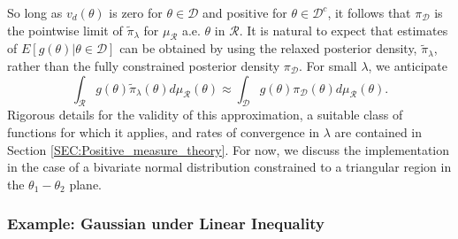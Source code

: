 \documentclass[10pt,fleqn]{article}
\DeclareMathOperator{\1}{\mathbbm{1}}
\begin{document}
So long as $v_d(\theta)$ is zero for $\theta \in \mathcal{D}$ and positive for $\theta\in\mathcal{D}^c$, it follows that $\pi_\mathcal{D}$ is the pointwise limit of $\tilde{\pi}_\lambda$ for $\mu_\mathcal{R}$ a.e. $\theta$ in $\mathcal{R}.$  It is natural to expect that estimates of $E[g(\theta)|\theta\in\mathcal{D}]$ can be obtained by using the relaxed posterior density, $\tilde{\pi}_\lambda$, rather than the fully constrained posterior density $\pi_\mathcal{D}$. For small $\lambda$, we anticipate
$$\int_\mathcal{R} g(\theta)\tilde{\pi}_\lambda(\theta) d\mu_\mathcal{R}(\theta) \approx \int_\mathcal{D} g(\theta)\pi_\mathcal{D}(\theta) d\mu_\mathcal{R}(\theta) .$$
Rigorous details for the validity of this approximation, a suitable class of functions for which it applies, and rates of convergence in $\lambda$ are contained in Section \ref{SEC:Positive_measure_theory}. For now, we discuss the implementation in the case of a bivariate normal distribution constrained to a triangular region in the $\theta_1-\theta_2$ plane.

\subsubsection{Example: Gaussian  under Linear Inequality}
\end{document}
